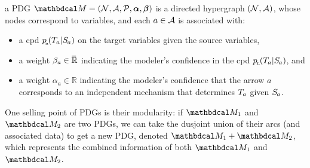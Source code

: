 \documentclass[twoside]{article}
\begin{document}
\begin{defn}
    a PDG $\dg M = (\N, \Ar, \mathcal P, \balpha, \bbeta )
    $
    is a directed hypergraph  $(\mathcal N, \mathcal A)$, whose nodes correspond to variables, and
    each $a \in \mathcal A$ is associated with:
    \begin{itemize}[itemsep=0pt]
        \item a cpd $p\ssub a (\Tgt a | \Src a)$ on the target variables given the source variables,
        \item a weight $\beta_a \in \mskip1mu\overline{\mskip-1mu\mathbb R\!}\,$ indicating 
            the modeler's confidence in the cpd $p\ssub L(\Tgt a | \Src a)$, and 
        \item a weight $\alpha_a \in \mathbb R$ indicating 
            the modeler's confidence that the arrow $a$ corresponds to an independent mechanism that determines $\Tgt a$ given $\Src a$. 
        \qedhere
    \end{itemize}
\end{defn}

One selling point of PDGs is their modularity: if $\dg M_1$ and $\dg M_2$ are two PDGs, we can take the dusjoint union of their arcs (and associated data) to get a new PDG, denoted $\dg M_1 + \dg M_2$,
which represents the combined information of both $\dg M_1$ and $\dg M_2$.
\end{document}
